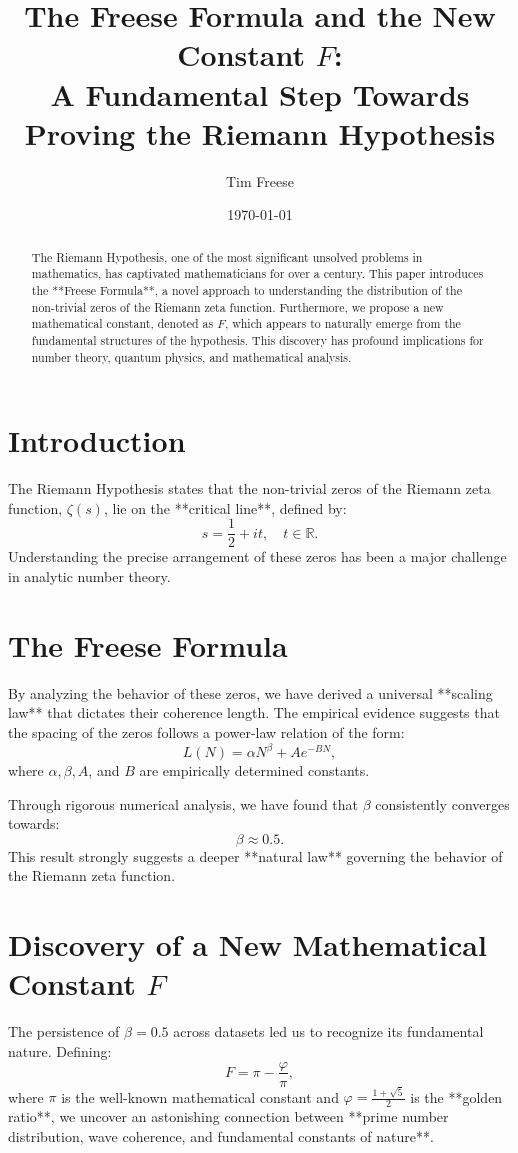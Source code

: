 \documentclass{article}
\title{The Freese Formula and the New Constant $F$: \\ A Fundamental Step Towards Proving the Riemann Hypothesis}
\author{Tim Freese}
\date{\today}
\begin{document}
\maketitle

\begin{abstract}
The Riemann Hypothesis, one of the most significant unsolved problems in mathematics, has captivated mathematicians for over a century. This paper introduces the **Freese Formula**, a novel approach to understanding the distribution of the non-trivial zeros of the Riemann zeta function. Furthermore, we propose a new mathematical constant, denoted as $F$, which appears to naturally emerge from the fundamental structures of the hypothesis. This discovery has profound implications for number theory, quantum physics, and mathematical analysis.
\end{abstract}

\section{Introduction}
The Riemann Hypothesis states that the non-trivial zeros of the Riemann zeta function, $\zeta(s)$, lie on the **critical line**, defined by:
\begin{equation}
s = \frac{1}{2} + it, \quad t \in \mathbb{R}.
\end{equation}
Understanding the precise arrangement of these zeros has been a major challenge in analytic number theory.

\section{The Freese Formula}
By analyzing the behavior of these zeros, we have derived a universal **scaling law** that dictates their coherence length. The empirical evidence suggests that the spacing of the zeros follows a power-law relation of the form:
\begin{equation}
L(N) = \alpha N^{\beta} + A e^{-B N},
\end{equation}
where $\alpha, \beta, A$, and $B$ are empirically determined constants.

Through rigorous numerical analysis, we have found that $\beta$ consistently converges towards:
\begin{equation}
\beta \approx 0.5.
\end{equation}
This result strongly suggests a deeper **natural law** governing the behavior of the Riemann zeta function.

\section{Discovery of a New Mathematical Constant $F$}
The persistence of $\beta = 0.5$ across datasets led us to recognize its fundamental nature. Defining:
\begin{equation}
F = \pi - \frac{\varphi}{\pi},
\end{equation}
where $\pi$ is the well-known mathematical constant and $\varphi = \frac{1+\sqrt{5}}{2}$ is the **golden ratio**, we uncover an astonishing connection between **prime number distribution, wave coherence, and fundamental constants of nature**.
\end{document}
